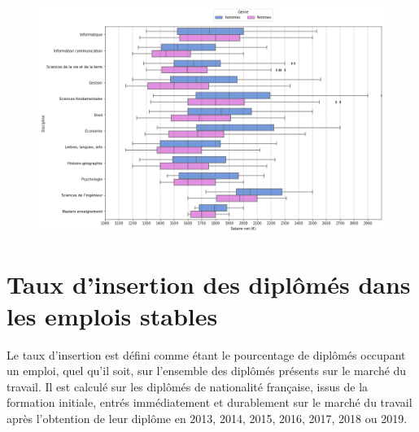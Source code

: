 \documentclass[12pt, a4paper, titlepage, table]{article}
\begin{document}
	\begin{figure}[H]
		\centering
		\includegraphics[width=1\textwidth]{../graphs/boxplot_salaire_discipline.png}
		\label{fig:boxplot_salaire_discipline}
	\end{figure}

\section{Taux d'insertion des diplômés dans les emplois stables}

Le taux d’insertion est défini comme étant le pourcentage de diplômés occupant un emploi, quel qu’il soit, sur l’ensemble des diplômés présents sur le marché du travail. Il est calculé sur les diplômés de nationalité française, issus de la formation initiale, entrés immédiatement et durablement sur le marché du travail après l’obtention de leur diplôme en 2013, 2014, 2015, 2016, 2017, 2018 ou 2019.
		
\end{document}
